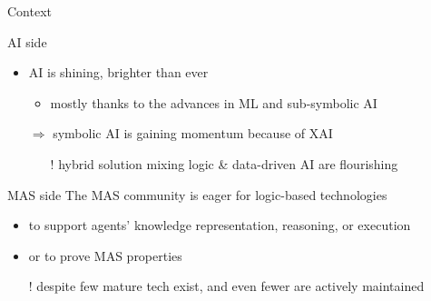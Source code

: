 \documentclass[presentation]{beamer}
\begin{document}
\begin{frame}[c]{Context}

    \begin{block}{AI side}
        \begin{itemize}
            \item AI is shining, brighter than ever
            \begin{itemize}
                \item mostly thanks to the advances in ML and sub-symbolic AI
            \end{itemize}

            \item[$\Rightarrow$] symbolic AI is gaining momentum because of XAI
            \begin{itemize}
                \item[!] hybrid solution mixing logic \& data-driven AI are flourishing 
            \end{itemize}
        \end{itemize}
    \end{block}

    \begin{block}{MAS side}
        The MAS community is eager for logic-based technologies 
        \begin{itemize}
            \item to support agents' knowledge representation, reasoning, or execution

            \item or to prove MAS properties

            \item[!] despite few mature tech exist, and even fewer are actively maintained
        \end{itemize}
    \end{block}
\end{frame}
\end{document}
